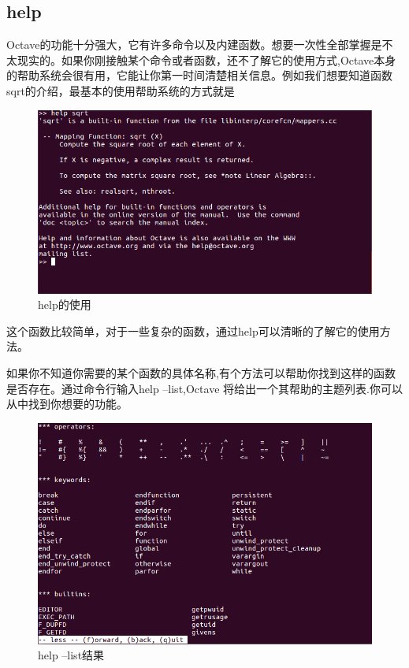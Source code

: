 \documentclass[a4paper,11pt]{ctexart}
\begin{document}
\subsection{help}
Octave的功能十分强大，它有许多命令以及内建函数。想要一次性全部掌握是不太现实的。如果你刚接触某个命令或者函数，还不了解它的使用方式,Octave本身的帮助系统会很有用，它能让你第一时间清楚相关信息。例如我们想要知道函数sqrt的介绍，最基本的使用帮助系统的方式就是
\begin{figure}[H]
	\begin{center}
		\includegraphics[width=.9\textwidth]{help.png}
	\end{center}
	\caption{help的使用}
\end{figure}
这个函数比较简单，对于一些复杂的函数，通过help可以清晰的了解它的使用方法。\par
如果你不知道你需要的某个函数的具体名称,有个方法可以帮助你找到这样的函数是否存在。通过命令行输入help --list,Octave 将给出一个其帮助的主题列表.你可以从中找到你想要的功能。
\begin{figure}[H]
	\begin{center}
		\includegraphics[width=.9\textwidth]{helplist.png}
	\end{center}
	\caption{help --list结果}
\end{figure}
\newpage
\end{document}
